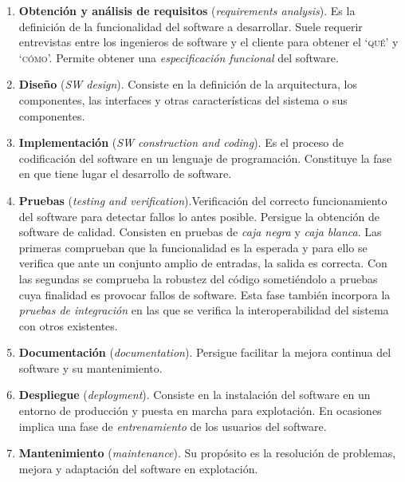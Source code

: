 \begin{enumerate}[1.-]
\item \textbf{Obtención y análisis de requisitos} (\emph{requirements analysis}). Es la definición de la funcionalidad del software a desarrollar. Suele requerir entrevistas entre los ingenieros de software y el cliente para obtener el `\textsc{qué}' y `\textsc{cómo}'. Permite obtener una \emph{especificación funcional} del software.

\item \textbf{Diseño} (\emph{SW design}). Consiste en la definición de la arquitectura, los componentes, las interfaces y otras características del sistema o sus componentes.

\item \textbf{Implementación} (\emph{SW construction and coding}). Es el proceso de codificación del software en un lenguaje de programación.  Constituye la fase en que tiene lugar el desarrollo de software.

\item \textbf{Pruebas} (\emph{testing and verification}).Verificación del correcto funcionamiento del software para detectar fallos lo antes posible. Persigue la obtención de software de calidad. Consisten en pruebas de \emph{caja negra} y \emph{caja blanca}. Las primeras comprueban que la funcionalidad es la esperada y para ello se verifica que ante un conjunto amplio de entradas, la salida es correcta. Con las segundas se comprueba la robustez del código sometiéndolo a pruebas cuya finalidad es provocar fallos de software. Esta fase también incorpora la \emph{pruebas de integración} en las que se verifica la interoperabilidad del sistema con otros existentes.

\item \textbf{Documentación} (\emph{documentation}). Persigue facilitar la mejora continua del software y su mantenimiento.

\item \textbf{Despliegue} (\emph{deployment}). Consiste en la instalación del software en un entorno de producción y puesta en marcha para explotación. En ocasiones implica una fase de \emph{entrenamiento} de los usuarios del software.

\item \textbf{Mantenimiento} (\emph{maintenance}). Su propósito es la resolución de problemas, mejora y adaptación del software en explotación.
\end{enumerate}





